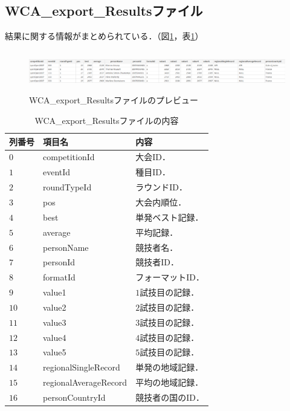 \documentclass{article}
\begin{document}
  \subsection{WCA\_export\_Resultsファイル}

  結果に関する情報がまとめられている．（図\ref{figure:results}，表\ref{table:results}）\par

  \begin{figure}[h]
    \centering
    \includegraphics[height=18mm]{results.png}
    \caption{WCA\_export\_Resultsファイルのプレビュー}
    \label{figure:results}
  \end{figure}

  \begin{table}[h]
    \centering
    \caption{WCA\_export\_Resultsファイルの内容}
    \label{table:results}
    \begin{tabular}{l|l|l}
      \hline
      列番号 & 項目名 & 内容 \\
      \hline \hline
      $ 0 $ & competitionId & 大会ID． \\
      $ 1 $ & eventId & 種目ID． \\
      $ 2 $ & roundTypeId & ラウンドID． \\
      $ 3 $ & pos & 大会内順位． \\
      $ 4 $ & best & 単発ベスト記録． \\
      $ 5 $ & average & 平均記録． \\
      $ 6 $ & personName & 競技者名． \\
      $ 7 $ & personId & 競技者ID． \\
      $ 8 $ & formatId & フォーマットID． \\
      $ 9 $ & value1 & $ 1 $試技目の記録． \\
      $ 10 $ & value2 & $ 2 $試技目の記録． \\
      $ 11 $ & value3 & $ 3 $試技目の記録． \\
      $ 12 $ & value4 & $ 4 $試技目の記録． \\
      $ 13 $ & value5 & $ 5 $試技目の記録． \\
      $ 14 $ & regionalSingleRecord & 単発の地域記録． \\
      $ 15 $ & regionalAverageRecord & 平均の地域記録． \\
      $ 16 $ & personCountryId & 競技者の国のID． \\
      \hline
    \end{tabular}
  \end{table}
\end{document}
